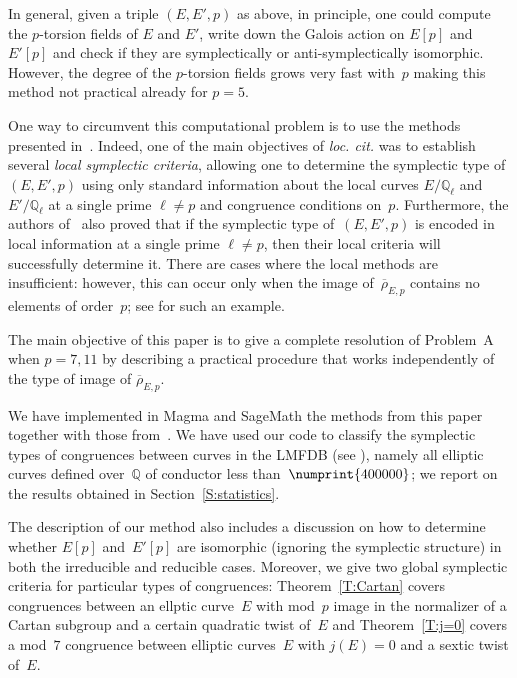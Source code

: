 \documentclass[12pt]{amsart}
\newcommand{\Q}{\mathbb{Q}}
\newcommand{\rhobar}{{\overline{\rho}}}
\numberwithin{equation}{section}
\theoremstyle{definition}
\theoremstyle{remark}
\newcommand{\Sage}{{\sc SageMath}}
\newcommand{\Magma}{{\sc Magma}}
\begin{document}
In general, given a triple $(E, E', p)$ as above, in principle, one
could compute the $p$-torsion fields of $E$ and $E'$,
write down the Galois action on $E[p]$ and $E'[p]$ and check if they
are symplectically or anti-symplectically isomorphic. However, the
degree of the $p$-torsion fields grows very fast with~$p$ making this
method not practical already for $p = 5$.

One way to circumvent this computational problem is to use the methods
presented in~\cite{FKSym}. Indeed, one of the main objectives of {\it
  loc. cit.}  was to establish several {\it local symplectic
  criteria}, allowing one to determine the symplectic type of
$(E,E',p)$ using only standard information about the local curves
$E/\Q_\ell$ and $E'/\Q_\ell$ at a single prime $\ell \neq p$ and
congruence conditions on~$p$. Furthermore, the authors of~\cite{FKSym}
also proved that if the symplectic type of~$(E,E',p)$ is encoded in
local information at a single prime $\ell \neq p$, then their local
criteria will successfully determine it.  There are cases where the
local methods are insufficient: however, this can occur only when
the image of~$\rhobar_{E,p}$ contains no elements of order~$p$; see \cite[Proposition~16]{FKSym} for such an example.

The main objective of this paper is to give a complete resolution of
Problem~A when $p=7,11$ by describing a practical procedure that works
independently of the type of image of $\rhobar_{E,p}$.  

We have implemented in {\Magma} \cite{magma} and {\Sage} \cite{sage} the methods
from this paper together with those from~\cite{FKSym}. We have used
our code to classify the symplectic types of congruences between
curves in the LMFDB (see \cite{lmfdb}), namely all elliptic curves
defined over~$\Q$ of conductor less than~$\numprint{400000}$; we report on the
results obtained in Section~\ref{S:statistics}.

The description of our method also includes a discussion on how to determine whether $E[p]$ and~$E'[p]$ are isomorphic (ignoring the symplectic structure) in both the irreducible and reducible cases. Moreover, we give two global symplectic criteria for particular types of congruences: Theorem~\ref{T:Cartan} covers congruences between an ellptic curve~$E$ with mod~$p$ image in the normalizer of a Cartan subgroup and a certain quadratic twist of~$E$ and Theorem~\ref{T:j=0} covers a mod~$7$ congruence between 
elliptic curves~$E$ with $j(E)=0$ and a sextic twist of~$E$.
\end{document}
